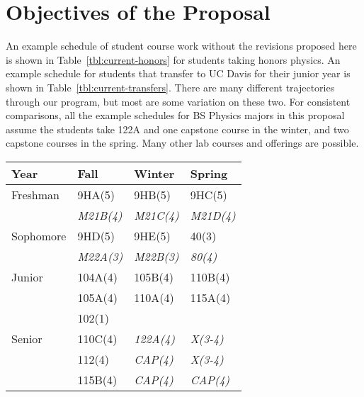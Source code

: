 \documentclass[12pt]{article}
\begin{document}
\newpage

\section{Objectives of the Proposal}

An example schedule of student course work without the revisions
proposed here is shown in Table~\ref{tbl:current-honors} for students
taking honors physics.  An example schedule for students that transfer
to UC Davis for their junior year is shown in
Table~\ref{tbl:current-transfers}.  There are many different
trajectories through our program, but most are some variation on these
two.  For consistent comparisons, all the example schedules for BS
Physics majors in this proposal assume the students take 122A and one
capstone course in the winter, and two capstone courses in the spring.
Many other lab courses and offerings are possible.

\begin{center}
\begin{tabular}{|l|l|l|l|}
\hline
Year      & Fall    & Winter & Spring \\
\hline
Freshman  & 9HA(5)     & 9HB(5)     & 9HC(5) \\
          & {\it M21B(4)}  & {\it M21C(4)}  & {\it M21D(4)} \\
\hline
Sophomore & 9HD(5)     & 9HE(5)     & 40(3)     \\
          & {\it M22A(3)}     & {\it M22B(3)} & {\it 80(4)} \\
\hline
Junior    & 104A(4) & 105B(4) & 110B(4)\\
          & 105A(4) & 110A(4) & 115A(4)\\
          & 102(1)  &    &     \\
\hline
Senior    & 110C(4) & {\it 122A(4)} & {\it X(3-4)}\\
          & 112(4)  & {\it CAP(4)}   & {\it X(3-4)}\\
          & 115B(4) & {\it CAP(4)}   & {\it CAP(4)}\\

\hline 
\end{tabular}
\end{center}
\end{document}
